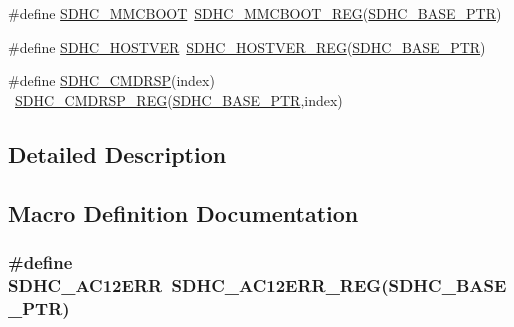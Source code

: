\begin{DoxyCompactItemize}
\item 
\#define \hyperlink{group___s_d_h_c___register___accessor___macros_gab4dff4aeb9392aabdb6f9e6dcf136428}{S\+D\+H\+C\+\_\+\+M\+M\+C\+B\+O\+OT}~\hyperlink{group___s_d_h_c___register___accessor___macros_gaee891df0b751b3a18a43a02d003520be}{S\+D\+H\+C\+\_\+\+M\+M\+C\+B\+O\+O\+T\+\_\+\+R\+EG}(\hyperlink{group___s_d_h_c___peripheral_gaf6d94732d48040eef799143f86be859c}{S\+D\+H\+C\+\_\+\+B\+A\+S\+E\+\_\+\+P\+TR})
\item 
\#define \hyperlink{group___s_d_h_c___register___accessor___macros_ga8a0985af9c573c7c102c0e8d61d525ad}{S\+D\+H\+C\+\_\+\+H\+O\+S\+T\+V\+ER}~\hyperlink{group___s_d_h_c___register___accessor___macros_ga83483fda8037182255e387b289c4324f}{S\+D\+H\+C\+\_\+\+H\+O\+S\+T\+V\+E\+R\+\_\+\+R\+EG}(\hyperlink{group___s_d_h_c___peripheral_gaf6d94732d48040eef799143f86be859c}{S\+D\+H\+C\+\_\+\+B\+A\+S\+E\+\_\+\+P\+TR})
\item 
\#define \hyperlink{group___s_d_h_c___register___accessor___macros_gaae9bcd896aa4cfecd4790e6ce949f3e3}{S\+D\+H\+C\+\_\+\+C\+M\+D\+R\+SP}(index)                                          ~\hyperlink{group___s_d_h_c___register___accessor___macros_ga286b1184e03e0b6c8fa5f4ff609b2d42}{S\+D\+H\+C\+\_\+\+C\+M\+D\+R\+S\+P\+\_\+\+R\+EG}(\hyperlink{group___s_d_h_c___peripheral_gaf6d94732d48040eef799143f86be859c}{S\+D\+H\+C\+\_\+\+B\+A\+S\+E\+\_\+\+P\+TR},index)
\end{DoxyCompactItemize}


\subsection{Detailed Description}


\subsection{Macro Definition Documentation}
\subsubsection[{\texorpdfstring{S\+D\+H\+C\+\_\+\+A\+C12\+E\+RR}{SDHC_AC12ERR}}]{\setlength{\rightskip}{0pt plus 5cm}\#define S\+D\+H\+C\+\_\+\+A\+C12\+E\+RR~{\bf S\+D\+H\+C\+\_\+\+A\+C12\+E\+R\+R\+\_\+\+R\+EG}({\bf S\+D\+H\+C\+\_\+\+B\+A\+S\+E\+\_\+\+P\+TR})}\hypertarget{group___s_d_h_c___register___accessor___macros_ga06d87f040cfa4a05b7cc9e815aa5f4f3}{}\label{group___s_d_h_c___register___accessor___macros_ga06d87f040cfa4a05b7cc9e815aa5f4f3}


